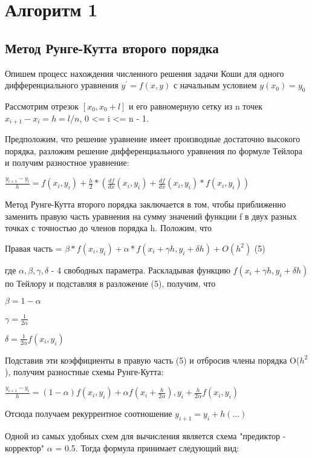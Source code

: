 \documentclass[a4paper,12pt,titlepage,finall]{article}
\begin{document}
\newpage

\section{Алгоритм 1}
\subsection{Метод Рунге-Кутта второго порядка}

Опишем процесс нахождения численного решения задачи Коши для одного дифференциального уравнения $y^{\prime} = f(x, y)$ с начальным условием $y(x_{0}) = y_{0}$

Рассмотрим отрезок $[x_{0},x_{0}+l]$ и его равномерную сетку из n точек $x_{i+1}-x_{i} = h = l/n$, 0 <= i <= n - 1.

Предположим, что решение уравнение имеет производные достаточно высокого порядка, разложим решение дифференциального уравнения по формуле Тейлора и получим разностное уравнение:

$\frac{y_{i+1}-y_{i}}{h} = f(x_{i}, y_{i}) + \frac{h}{2} * (\frac{df}{dx}(x_{i},y_{i})+ \frac{df}{dx}(x_{i},y_{i}) * f(x_{i}, y_{i}))$


Метод Рунге-Кутта второго порядка заключается в том, чтобы приближенно заменить правую часть уравнения на сумму значений функции f в двух разных точках с точностью до членов порядка h. Положим, что

Правая часть = $\beta * f(x_{i},y_{i}) + \alpha * f(x_{i} + \gamma h,y_{i}+\delta h) + O(h^{2})$  (5)

где $\alpha,\beta,\gamma,\delta$ - 4 свободных параметра. Раскладывая функцию $f(x_{i} + \gamma h,y_{i}+\delta h)$ по Тейлору и подставляя в разложение (5), получим, что

$\beta = 1 - \alpha$

$\gamma = \frac{1}{2\alpha}$

$\delta = \frac{1}{2\alpha} f(x_{i}, y_{i})$

Подставив эти коэффициенты в правую часть (5) и отбросив члены порядка O($h^{2}$), получим разностные схемы Рунге-Кутта:

$\frac{y_{i+1}-y_{i}}{h} = (1-\alpha)f(x_{i},y_{i})+\alpha f(x_{i}+\frac{h}{2\alpha}),y_{i}+\frac{h}{2\alpha}f(x_{i},y_{i})$

Отсюда получаем рекуррентное соотношение $y_{i+1} = y_{i}+h(...)$


Одной из самых удобных схем для вычисления является схема "предиктор - корректор" $\alpha$ = 0.5. Тогда формула принимает следующий вид:
\end{document}

